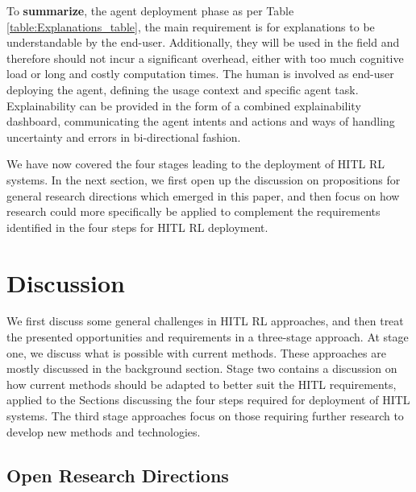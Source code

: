 \documentclass[twoside,11pt]{article}
\begin{document}

\noindent To \textbf{summarize}, the agent deployment phase as per Table \ref{table:Explanations_table}, the main requirement is for explanations to be understandable by the end-user. Additionally, they will be used in the field and therefore should not incur a significant overhead, either with  too much cognitive load or long and costly computation times. The human is involved as end-user deploying the agent, defining the usage context and specific agent task. Explainability can be provided in the form of a combined explainability dashboard, communicating the agent intents and actions and ways of handling uncertainty and errors in bi-directional fashion.

We have now covered the four stages leading to the deployment of HITL RL systems. In the next section, we first open up the discussion on propositions for general research directions which emerged in this paper, and then focus on how research could more specifically be applied to complement the requirements identified in the four steps for HITL RL deployment.

\section{Discussion}
\label{sec:discussion}
We first discuss some general challenges in HITL RL approaches, and then treat the presented opportunities and requirements in a three-stage approach. At stage one, we discuss what is possible with current methods. These approaches are mostly discussed in the background section. Stage two contains a discussion on how current methods should be adapted to better suit the HITL requirements, applied to the Sections discussing the four steps required for deployment of HITL systems. The third stage approaches focus on those requiring further research to develop new methods and technologies.

\subsection{Open Research Directions}
\end{document}
